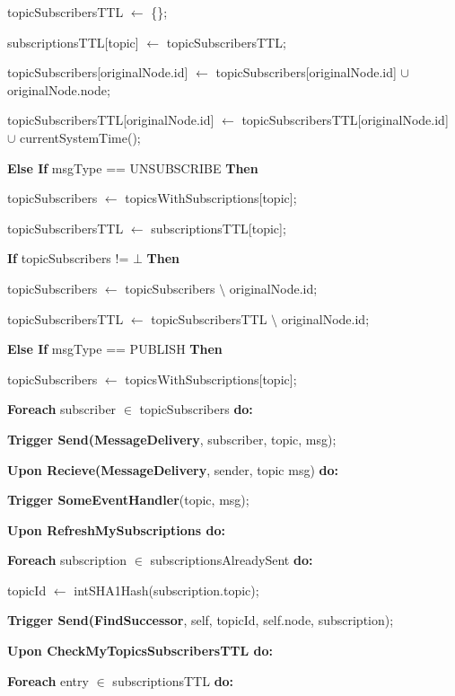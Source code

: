 \documentclass[12pt]{article}
\begin{document}
\qquad \qquad \qquad topicSubscribersTTL $\leftarrow$ \{\};

\qquad \qquad \qquad subscriptionsTTL[topic] $\leftarrow$ topicSubscribersTTL;

\qquad \qquad topicSubscribers[originalNode.id] $\leftarrow$ topicSubscribers[originalNode.id] $\cup$ originalNode.node;

\qquad \qquad topicSubscribersTTL[originalNode.id] $\leftarrow$ topicSubscribersTTL[originalNode.id] $\cup$ currentSystemTime();

\qquad \textbf{Else If} msgType == UNSUBSCRIBE \textbf{Then}

\qquad \qquad topicSubscribers $\leftarrow$ topicsWithSubscriptions[topic];

\qquad \qquad topicSubscribersTTL $\leftarrow$ subscriptionsTTL[topic];

\qquad \qquad \textbf{If} topicSubscribers != $\bot$ \textbf{Then}

\qquad \qquad \qquad 
topicSubscribers $\leftarrow$ topicSubscribers $\setminus$ originalNode.id;

\qquad \qquad \qquad 
topicSubscribersTTL $\leftarrow$ topicSubscribersTTL $\setminus$ originalNode.id;

\qquad \textbf{Else If} msgType == PUBLISH \textbf{Then}

\qquad \qquad topicSubscribers $\leftarrow$ topicsWithSubscriptions[topic];


\qquad \qquad \textbf{Foreach} subscriber $\in$ topicSubscribers \textbf{do:}

\qquad \qquad \qquad \textbf{Trigger Send(MessageDelivery}, subscriber, topic, msg);

\bigbreak
\textbf{Upon Recieve(MessageDelivery}, sender, topic msg) \textbf{do:}

\qquad \textbf{Trigger SomeEventHandler}(topic, msg);

\bigbreak
\textbf{Upon RefreshMySubscriptions do:}

\qquad \textbf{Foreach} subscription $\in$ 
subscriptionsAlreadySent \textbf{do:}

\qquad \qquad topicId $\leftarrow$ intSHA1Hash(subscription.topic);

\qquad \qquad \textbf{Trigger Send(FindSuccessor}, self, topicId, self.node, subscription);

\bigbreak
\textbf{Upon CheckMyTopicsSubscribersTTL do:}

\qquad \textbf{Foreach} entry $\in$ subscriptionsTTL \textbf{do:}
\end{document}
